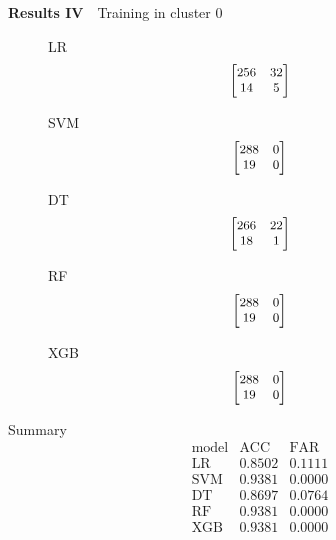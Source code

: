 \documentclass[12pt,aspectratio=43]{beamer}
\begin{document}
\begin{frame}{\textbf{Results IV}　{Training in cluster 0}}
\linespread{0.9}
{\small
\begin{figure}[h]
\centering

\begin{minipage}{0.28\linewidth}
\raggedright
{\small LR}
$$
\small
\begin{bmatrix}
256 & 32 \\
14  & 5
\end{bmatrix}
$$
\end{minipage}
\begin{minipage}{0.28\linewidth}
\raggedright
{\small SVM}
$$
\small
\begin{bmatrix}
288 & 0 \\
19  & 0
\end{bmatrix}
$$
\end{minipage}
\begin{minipage}{0.28\linewidth}
\raggedright
{\small DT}
$$
\small
\begin{bmatrix}
266 & 22 \\
18  & 1
\end{bmatrix}
$$
\end{minipage}

\vspace{0.5em}

\begin{minipage}{0.28\linewidth}
\raggedright
{\small RF}
$$
\small
\begin{bmatrix}
288 & 0 \\
19  & 0
\end{bmatrix}
$$
\end{minipage}
\begin{minipage}{0.28\linewidth}
\raggedright
{\small XGB}
$$
\small
\begin{bmatrix}
288 & 0 \\
19  & 0
\end{bmatrix}
$$
\end{minipage}

\end{figure}
}

{\small
Summary
$$
\begin{array}{l|cc}
\text{model} & \text{ACC} & \text{FAR} \\
\hline
\text{LR} & 0.8502 & 0.1111 \\
\text{SVM}           & 0.9381 & 0.0000 \\
\text{DT}       & 0.8697 & 0.0764 \\
\text{RF}       & 0.9381 & 0.0000 \\
\text{XGB}            & 0.9381 & 0.0000 \\
\end{array}
$$
}

\end{frame}
\end{document}

